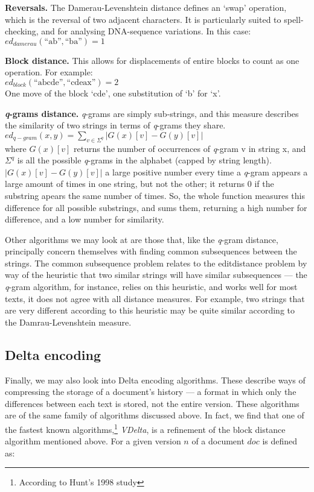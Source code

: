 \textbf{Reversals.} The Damerau-Levenshtein distance defines an `swap'
operation, which is the reversal of two adjacent characters. It is
particularly suited to spell-checking, and for analysing DNA-sequence
variations. In this case:\\ $ed_{damerau}(\text{``ab''},\text{``ba''})
= 1$

\textbf{Block distance.} This allows for displacements of entire
blocks to count as one operation. For
example:\\ $ed_{block}(\text{``abcde''},\text{``cdeax''})= 2$ \\ One
move of the block `cde', one substitution of `b' for
`x'.\cite{Tichy1984}

\textbf{\textit{q}-grams distance.} \textit{q}-grams are simply
sub-strings, and this measure describes the similarity of two strings
in terms of \textit{q}-grams they
share.\cite{Ukkonen1992}\\ $ed_{q-gram}(x,y)=\sum\limits_{v\in\Sigma
  ^q}|G(x)[v]-G(y)[v]|$\\ where $G(x)[v]$ returns the number of
occurrences of \textit{q}-gram v in string x, and $\Sigma ^q$ is all
the possible \textit{q}-grams in the alphabet (capped by string
length). $|G(x)[v]-G(y)[v]|$ a large positive number every time a
\textit{q}-gram appears a large amount of times in one string, but not
the other; it returns 0 if the substring apears the same number of
times. So, the whole function measures this difference for all
possible substrings, and sums them, returning a high number for
difference, and a low number for similarity.


Other algorithms we may look at are those that, like the
\textit{q}-gram distance, principally concern themselves with finding
common subsequences between the strings. The common subsequence
problem relates to the editdistance problem by way of the
heuristic that two similar strings will have similar subsequences ---
the \textit{q}-gram algorithm, for instance, relies on this heuristic,
and works well for most texts, it does not agree with all distance
measures. For example, two strings that are very different according
to this heuristic may be quite similar according to the
Damrau-Levenshtein measure.


\subsection*{Delta encoding}
Finally, we may also look into Delta encoding algorithms. These
describe ways of compressing the storage of a document's history --- a
format in which only the differences between each text is stored, not
the entire version. These algorithms are of the same family of
algorithms discussed above. In fact, we find that one of the fastest
known algorithms,\footnote{According to Hunt's 1998
  study\cite{Hunt1998}} \textit{VDelta}, is a refinement of the block
distance algorithm mentioned above. For a given version $n$ of a
document $doc$ is defined as:

